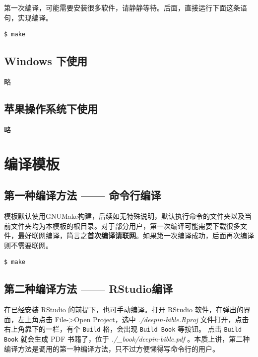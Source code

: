 \documentclass[doctor,openright,twoside]{sjtuthesis}
\newcommand{\passthrough}[1]{#1}
\theoremstyle{plain}
\theoremstyle{definition}
\theoremstyle{remark}
\theoremstyle{ocrenumbox}
\theoremstyle{plain}
\begin{document}
第一次编译，可能需要安装很多软件，请静静等待。后面，直接运行下面这条语句，实现编译。

\begin{lstlisting}[language=bash, numbers=none]
$ make
\end{lstlisting}

\hypertarget{windows-}{%
\subsection{Windows 下使用}\label{windows-}}

略

\hypertarget{section-142}{%
\subsection{苹果操作系统下使用}\label{section-142}}

略

\hypertarget{section-143}{%
\section{编译模板}\label{section-143}}

\hypertarget{section-144}{%
\subsection{第一种编译方法 ------ 命令行编译}\label{section-144}}

模板默认使用GNUMake构建，后续如无特殊说明，默认执行命令的文件夹以及当前文件夹均为本模板的根目录。对于部分用户，第一次编译可能需要下载很多文件，最好联网编译，简言之\textbf{首次编译请联网}。如果第一次编译成功，后面再次编译则不需要联网。

\begin{lstlisting}[language=bash, numbers=none]
$ make
\end{lstlisting}

\hypertarget{rstudio}{%
\subsection{第二种编译方法 ------ RStudio编译}\label{rstudio}}

在已经安装 RStudio 的前提下，也可手动编译。打开 RStudio 软件，在弹出的界面，左上角点击 File-\textgreater Open Project，选中 \emph{./deepin-bible.Rproj} 文件打开，点击右上角靠下的一栏，有个 \passthrough{\lstinline!Build!} 格，会出现 \passthrough{\lstinline!Build Book!} 等按钮。
点击 \passthrough{\lstinline!Build Book!} 就会生成 PDF 书籍了，位于 \emph{./\_book/deepin-bible.pdf} 。本质上讲，第二种编译方法是调用的第一种编译方法，只不过方便懒得写命令行的用户。
\end{document}
